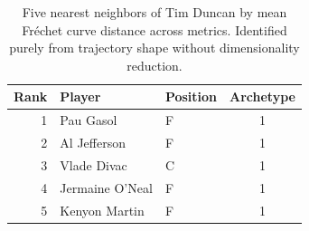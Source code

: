 \begin{table}[htbp]
  \centering\small
  \begin{tabular}{rllc}
    \toprule
    Rank & Player & Position & Archetype \\
    \midrule
    1 & Pau Gasol & F & 1 \\
    2 & Al Jefferson & F & 1 \\
    3 & Vlade Divac & C & 1 \\
    4 & Jermaine O'Neal & F & 1 \\
    5 & Kenyon Martin & F & 1 \\
    \bottomrule
  \end{tabular}
  \caption{Five nearest neighbors of Tim Duncan by mean Fr\'{e}chet curve distance across metrics. Identified purely from trajectory shape without dimensionality reduction.}
  \label{tab:Tim_Duncan_frechet_curve_neighbors}
\end{table}

